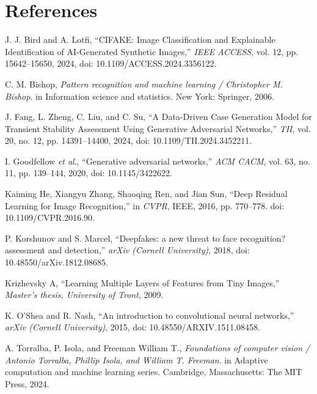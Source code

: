 \documentclass{article}
\begin{document}
\section{References}
\begin{enumerate}[label={[\arabic*]}]
    \item J. J. Bird and A. Lotfi, “CIFAKE: Image Classification and Explainable Identification of AI-Generated Synthetic Images,” \textit{IEEE ACCESS}, vol. 12, pp. 15642–15650, 2024, doi: 10.1109/ACCESS.2024.3356122.
    \item C. M. Bishop, \textit{Pattern recognition and machine learning / Christopher M. Bishop}. in Information science and statistics. New York: Springer, 2006.
    \item J. Fang, L. Zheng, C. Liu, and C. Su, “A Data-Driven Case Generation Model for Transient Stability Assessment Using Generative Adversarial Networks,” \textit{TII}, vol. 20, no. 12, pp. 14391–14400, 2024, doi: 10.1109/TII.2024.3452211.
    \item I. Goodfellow \textit{et al}., “Generative adversarial networks,” \textit{ACM CACM}, vol. 63, no. 11, pp. 139–144, 2020, doi: 10.1145/3422622.
    \item Kaiming He, Xiangyu Zhang, Shaoqing Ren, and Jian Sun, “Deep Residual Learning for Image Recognition,” in \textit{CVPR}, IEEE, 2016, pp. 770–778. doi: 10.1109/CVPR.2016.90.
    \item P. Korshunov and S. Marcel, “Deepfakes: a new threat to face recognition? assessment and detection,” \textit{arXiv (Cornell University)}, 2018, doi: 10.48550/arXiv.1812.08685.
    \item Krizhevsky A, “Learning Multiple Layers of Features from Tiny Images,” \textit{Master’s thesis, University of Tront}, 2009.
    \item K. O’Shea and R. Nash, “An introduction to convolutional neural networks,” \textit{arXiv (Cornell University)}, 2015, doi: 10.48550/ARXIV.1511.08458.
    \item A. Torralba, P. Isola, and Freeman William T., \textit{Foundations of computer vision / Antonio Torralba, Phillip Isola, and William T. Freeman}. in Adaptive computation and machine learning series. Cambridge, Massachusetts: The MIT Press, 2024.
\end{enumerate}
\end{document}
